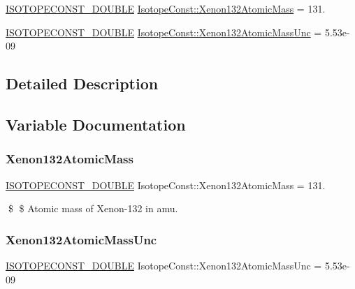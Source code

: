 \begin{DoxyCompactItemize}
\item 
\mbox{\hyperlink{group___isotope_const-_macros_ga8f45a7272ce02c0b4c65c44636ed719a}{I\+S\+O\+T\+O\+P\+E\+C\+O\+N\+S\+T\+\_\+\+D\+O\+U\+B\+LE}} \mbox{\hyperlink{group___isotope_const-_xenon-_xe132_ga90727c5923e3a8049ee3c0b13d3ca376}{Isotope\+Const\+::\+Xenon132\+Atomic\+Mass}} = 131.
\item 
\mbox{\hyperlink{group___isotope_const-_macros_ga8f45a7272ce02c0b4c65c44636ed719a}{I\+S\+O\+T\+O\+P\+E\+C\+O\+N\+S\+T\+\_\+\+D\+O\+U\+B\+LE}} \mbox{\hyperlink{group___isotope_const-_xenon-_xe132_gaf54db66ed45bfb14f644a5d081648895}{Isotope\+Const\+::\+Xenon132\+Atomic\+Mass\+Unc}} = 5.\+53e-\/09
\end{DoxyCompactItemize}


\subsection{Detailed Description}


\subsection{Variable Documentation}
\mbox{\label{group___isotope_const-_xenon-_xe132_ga90727c5923e3a8049ee3c0b13d3ca376}} 
\subsubsection{\texorpdfstring{Xenon132\+Atomic\+Mass}{Xenon132AtomicMass}}
{\footnotesize\ttfamily \mbox{\hyperlink{group___isotope_const-_macros_ga8f45a7272ce02c0b4c65c44636ed719a}{I\+S\+O\+T\+O\+P\+E\+C\+O\+N\+S\+T\+\_\+\+D\+O\+U\+B\+LE}} Isotope\+Const\+::\+Xenon132\+Atomic\+Mass = 131.}

\$ \$ Atomic mass of Xenon-\/132 in amu. \mbox{\label{group___isotope_const-_xenon-_xe132_gaf54db66ed45bfb14f644a5d081648895}} 
\subsubsection{\texorpdfstring{Xenon132\+Atomic\+Mass\+Unc}{Xenon132AtomicMassUnc}}
{\footnotesize\ttfamily \mbox{\hyperlink{group___isotope_const-_macros_ga8f45a7272ce02c0b4c65c44636ed719a}{I\+S\+O\+T\+O\+P\+E\+C\+O\+N\+S\+T\+\_\+\+D\+O\+U\+B\+LE}} Isotope\+Const\+::\+Xenon132\+Atomic\+Mass\+Unc = 5.\+53e-\/09}

